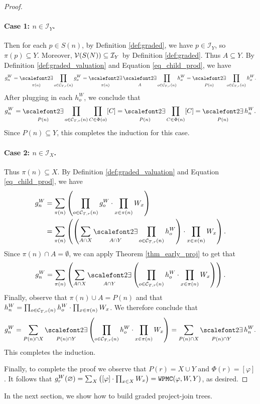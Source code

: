 \begin{proof}
\paragraph{Case 1: $n \in \mathcal{I}_Y$.} Then for each $p \in S(n)$, by Definition \ref{def:graded}, we have $p \in \mathcal{I}_Y$, so $\pi(p) \subseteq Y$. Moreover, $\mathcal{V}(S(N)) \subseteq \mathcal{I}_Y$ by Definition \ref{def:graded}. Thus $A \subseteq Y$. 
By Definition \ref{def:graded_valuation} and Equation \eqref{eq_child_prod}, we have
\begin{equation*}
    g^W_n = \displaystyle\exist_{\pi(n)} \prod_{o \in \C{T}{r}{n}} g^W_o = \displaystyle\exist_{\pi(n)} \displaystyle\exist_{A} \prod_{o \in \C{T}{r}{n}} h^W_o = \displaystyle\exist_{P(n)} \prod_{o \in \C{T}{r}{n}} h^W_o.
\end{equation*}
After plugging in each $h^W_o$, we conclude that $$g^W_n = \displaystyle\exist_{P(n)} \prod_{o \in \C{T}{r}{n}} \prod_{C \in \Phi(o)} [C] = \displaystyle\exist_{P(n)} \prod_{C \in \Phi(n)} [C] = \displaystyle\exist_{P(n)} h^W_n.$$
Since $P(n) \subseteq Y$, this completes the induction for this case.


\paragraph{Case 2: $n \in \mathcal{I}_X$.} Thus $\pi(n) \subseteq X$. 
By Definition \ref{def:graded_valuation} and Equation \eqref{eq_child_prod}, we have
\begin{align*}
    g^W_n 
    &= \displaystyle\sum_{\pi(n)} \pars{ \prod_{o \in \C T r n} g^W_o \cdot \prod_{x \in \pi(n)} W_x }\\ 
    &= \sum_{\pi(n)} \pars{ \pars{ \sum_{A \cap X} \displaystyle\exist_{A \cap Y} \prod_{o \in \C{T}{r}{n}} h^W_o } \cdot \prod_{x \in \pi(n)} W_x }.
\end{align*}
Since $\pi(n) \cap A = \emptyset$, we can apply Theorem \ref{thm_early_proj} to get that
\begin{equation*}
    g^W_n = \sum_{\pi(n)} \pars{ \sum_{A \cap X} \displaystyle\exist_{A \cap Y} \left( \prod_{o \in \C{T}{r}{n}} h^W_o \cdot \prod_{x \in \pi(n)} W_x \right) }.
\end{equation*}
Finally, observe that $\pi(n) \cup A = P(n)$ and that $h^W_n = \prod_{o \in \mathcal{C}_{T,r}(n)} h^W_o \cdot \prod_{x \in \pi(n)} W_x$. We therefore conclude that
\begin{equation*}
    g^W_n = \sum_{P(n) \cap X} \displaystyle\exist_{P(n) \cap Y} \left( \prod_{o \in \C{T}{r}{n}} h^W_o \cdot \prod_{x \in \pi(n)} W_x \right) =  \sum_{P(n) \cap X} \displaystyle\exist_{P(n) \cap Y} h^W_n.
\end{equation*}
This completes the induction.

Finally, to complete the proof we observe that $P(r) = X \cup Y$ and $\Phi(r) = [\varphi]$. It follows that $g^W_r(\varnothing) = \sum_X \left(  [\varphi] \cdot \prod_{x \in X} W_x  \right) = \texttt{\upshape WPMC}(\varphi, W, Y)$, as desired.
\end{proof}

In the next section, we show how to build graded project-join trees.